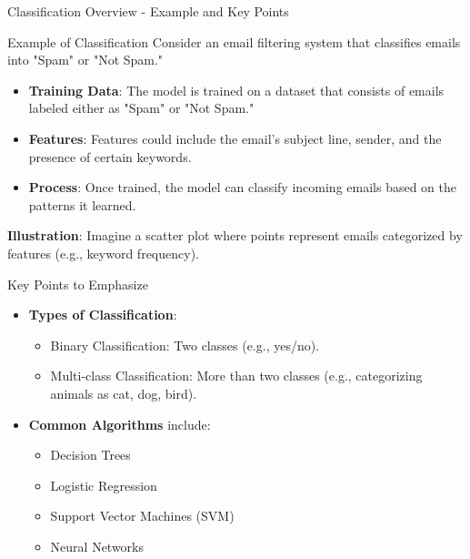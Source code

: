 \documentclass[aspectratio=169]{beamer}
\begin{document}
\begin{frame}[fragile]{Classification Overview - Example and Key Points}
    \begin{block}{Example of Classification}
        Consider an email filtering system that classifies emails into "Spam" or "Not Spam." 
        \begin{itemize}
            \item \textbf{Training Data}: The model is trained on a dataset that consists of emails labeled either as "Spam" or "Not Spam."
            \item \textbf{Features}: Features could include the email's subject line, sender, and the presence of certain keywords.
            \item \textbf{Process}: Once trained, the model can classify incoming emails based on the patterns it learned.
        \end{itemize}
        \textbf{Illustration}: Imagine a scatter plot where points represent emails categorized by features (e.g., keyword frequency).
    \end{block}
    
    \begin{block}{Key Points to Emphasize}
        \begin{itemize}
            \item \textbf{Types of Classification}:
            \begin{itemize}
                \item Binary Classification: Two classes (e.g., yes/no).
                \item Multi-class Classification: More than two classes (e.g., categorizing animals as cat, dog, bird).
            \end{itemize}

            \item \textbf{Common Algorithms} include:
            \begin{itemize}
                \item Decision Trees
                \item Logistic Regression
                \item Support Vector Machines (SVM)
                \item Neural Networks
            \end{itemize}
        \end{itemize}
    \end{block}
\end{frame}
\end{document}
